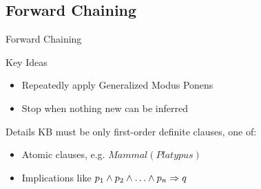 \documentclass[14pt]{beamer}
\begin{document}
\subsection{Forward Chaining}

\begin{frame}{Forward Chaining}
	\begin{block}{Key Ideas}
		\begin{itemize}
			\item Repeatedly apply Generalized Modus Ponens
			\item Stop when nothing new can be inferred
		\end{itemize}
	\end{block}
	\pause
	\begin{block}{Details}
		KB must be only \alert{first-order definite clauses}, one of:
		\begin{itemize}
			\item Atomic clauses, e.g. $\textit{Mammal}(\textit{Platypus})$
			\item Implications like $p_1 \land p_2 \land \ldots \land p_n \Rightarrow q$
		\end{itemize}
	\end{block}
\end{frame}
\end{document}
